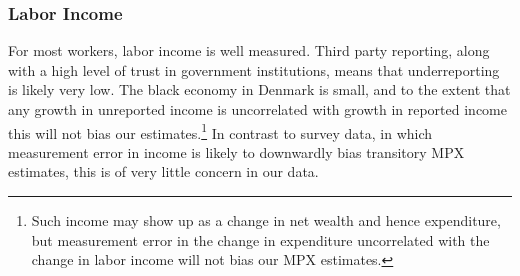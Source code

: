 \documentclass[titlepage]{\econtex}\newcommand{\texname}{ConsumptionHeterogeneity}
\begin{document}
	\subsubsection{Labor Income}
	For most workers, labor income is well measured. Third party reporting, along with a high level of trust in government institutions, means that underreporting is likely very low. The black economy in Denmark is small, and to the extent that any growth in unreported income is uncorrelated with growth in reported income this will not bias our estimates.\footnote{Such income may show up as a change in net wealth and hence expenditure, but measurement error in the change in expenditure uncorrelated with the change in labor income will not bias our MPX estimates.} In contrast to survey data, in which measurement error in income is likely to downwardly bias transitory MPX estimates, this is of very little concern in our data.
	
\end{document}
